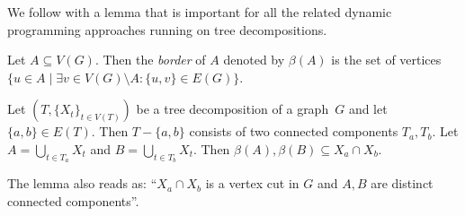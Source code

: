 We follow with a lemma that is important for all the related
dynamic programming approaches running on tree decompositions.
%
\begin{definition}
	Let \( A \subseteq V(G) \). Then the \emph{border} of \( A \) denoted by \( \beta(A) \)
	is the set of vertices
	\( \{u \in A \mid \exists v \in V(G) \setminus A : \{u, v\} \in E(G) \} \).
\end{definition}
%
\begin{lemma}
	Let \( (T, {\{X_t\}}_{t \in V ( T )}) \)
	be a tree decomposition of a graph~\( G \)
	and let \( \{a, b\} \in E(T) \).
	Then \( T - \{a, b\} \) consists of two connected components \( T_a, T_b \).
	Let \( A = \bigcup_{t \in T_a} X_t \) and \( B = \bigcup_{t \in T_b} X_t \).
	Then \( \beta(A), \beta(B) \subseteq X_a \cap X_b \).
\end{lemma}
%
The lemma also reads as:
``\( X_a \cap X_b \) is a vertex cut in \( G \) and \( A, B \)
are distinct connected components''.

